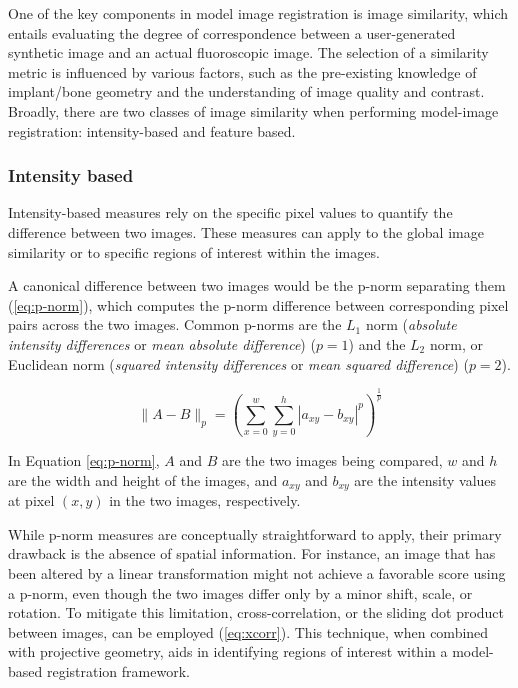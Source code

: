 One of the key components in model image registration is image similarity, which entails evaluating the degree of correspondence between a user-generated synthetic image and an actual fluoroscopic image.
The selection of a similarity metric is influenced by various factors, such as the pre-existing knowledge of implant/bone geometry and the understanding of image quality and contrast.
Broadly, there are two classes of image similarity when performing model-image registration: intensity-based and feature based.

\subsubsection{Intensity based}
\label{sec:img-sim-intensity}
Intensity-based measures rely on the specific pixel values to quantify the difference between two images.
These measures can apply to the global image similarity or to specific regions of interest within the images.

A canonical difference between two images would be the p-norm separating them (\cref{eq:p-norm}), which computes the p-norm difference between corresponding pixel pairs across the two images.
Common p-norms are the $L_1$ norm (\emph{absolute intensity differences} or \emph{mean absolute difference}) \cite{kanadeStereoMatchingAlgorithm1994} ($p=1$) and the $L_{2}$ norm, or Euclidean norm (\emph{squared intensity differences} or \emph{mean squared difference}) \cite{hannahComputerMatchingAreas1977}($p=2$).

\begin{equation}
    \|A-B\|_{p} = (\sum_{x=0}^{w}\sum_{y=0}^{h}|a_{xy}-b_{xy}|^{p})^{\frac{1}{p}}
    \label{eq:p-norm}
\end{equation}

In Equation \cref{eq:p-norm}, $A$ and $B$ are the two images being compared, $w$ and $h$ are the width and height of the images, and $a_{xy}$ and $b_{xy}$ are the intensity values at pixel $(x,y)$ in the two images, respectively.

While p-norm measures are conceptually straightforward to apply, their primary drawback is the absence of spatial information.
For instance, an image that has been altered by a linear transformation might not achieve a favorable score using a p-norm, even though the two images differ only by a minor shift, scale, or rotation.
To mitigate this limitation, cross-correlation, or the sliding dot product between images, can be employed \cite{bendatRandomDataAnalysis2010,hannahComputerMatchingAreas1977} (\cref{eq:xcorr}).
This technique, when combined with projective geometry, aids in identifying regions of interest within a model-based registration framework.

